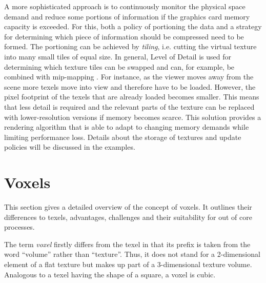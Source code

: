A more sophisticated approach is to continuously monitor the physical space demand and reduce some portions of information if the graphics card memory capacity is exceeded. For this, both a policy of portioning the data and a strategy for determining which piece of information should be compressed need to be formed. The portioning can be achieved by \textit{tiling}, i.e. cutting the virtual texture into many small tiles of equal size. In general, Level of Detail is used for determining which texture tiles can be swapped and can, for example, be combined with mip-mapping \cite{Crassin:2009:GRS:1507149.1507152}. For instance, as the viewer moves away from the scene more texels move into view and therefore have to be loaded. However, the pixel footprint of the texels that are already loaded becomes smaller. This means that less detail is required and the relevant parts of the texture can be replaced with lower-resolution versions if memory becomes scarce. This solution provides a rendering algorithm that is able to adapt to changing memory demands while limiting performance loss. Details about the storage of textures and update policies will be discussed in the examples.

\section{Voxels}

This section gives a detailed overview of the concept of voxels. It outlines their differences to texels, advantages, challenges and their suitability for out of core processes.

The term \textit{voxel} firstly differs from the texel in that its prefix is taken from the word ``volume'' rather than ``texture''. Thus, it does not stand for a 2-dimensional element of a flat texture but makes up part of a 3-dimensional texture volume. Analogous to a texel having the shape of a square, a voxel is cubic.

